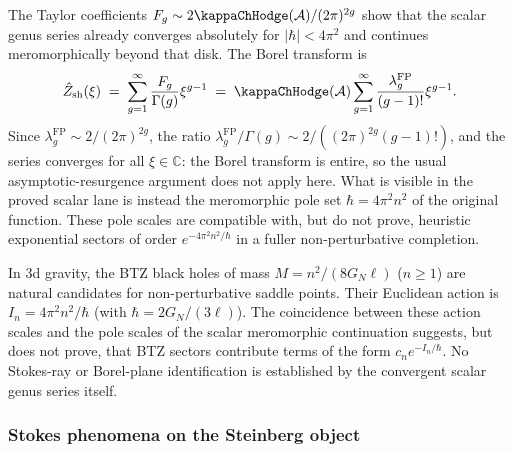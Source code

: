\begin{evidence}
The Taylor coefficients $F_g \sim 2\kappaChHodge(\cA)/(2\pi)^{2g}$ show that the scalar genus series already converges absolutely for $|\hbar| < 4\pi^2$ and continues meromorphically beyond that disk. The Borel transform is
\begin{equation}%
\hat{Z}_{\mathrm{sh}}(\xi) \;=\; \sum_{g=1}^\infty \frac{F_g}{\Gamma(g)} \xi^{g-1} \;=\; \kappaChHodge(\cA) \sum_{g=1}^\infty \frac{\lambda_g^{\mathrm{FP}}}{(g-1)!} \xi^{g-1}.
\end{equation}
Since $\lambda_g^{\mathrm{FP}} \sim 2/(2\pi)^{2g}$, the ratio $\lambda_g^{\mathrm{FP}}/\Gamma(g) \sim 2/((2\pi)^{2g}(g-1)!)$, and the series converges for all $\xi \in \mathbb{C}$: the Borel transform is entire, so the usual asymptotic-resurgence argument does not apply here. What is visible in the proved scalar lane is instead the meromorphic pole set $\hbar = 4\pi^2 n^2$ of the original function. These pole scales are compatible with, but do not prove, heuristic exponential sectors of order $e^{-4\pi^2 n^2/\hbar}$ in a fuller non-perturbative completion.
\end{evidence}

\begin{remark}
\label{rem:thqg-I-btz-saddles}
In 3d gravity, the BTZ black holes of mass $M = n^2/(8G_N\ell)$ ($n \geq 1$) are natural candidates for non-perturbative saddle points. Their Euclidean action is $I_n = 4\pi^2 n^2 / \hbar$ (with $\hbar = 2G_N/(3\ell)$). The coincidence between these action scales and the pole scales of the scalar meromorphic continuation suggests, but does not prove, that BTZ sectors contribute terms of the form $c_n e^{-I_n/\hbar}$. No Stokes-ray or Borel-plane identification is established by the convergent scalar genus series itself.
\end{remark}

\providecommand{\SteinbergB}{\mathfrak{S}_b}

\subsubsection{Stokes phenomena on the Steinberg object}


